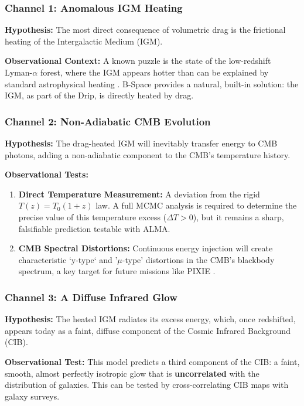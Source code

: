 \documentclass{BSpacePaper} %
\begin{document}
\begin{appendices}
\subsubsection{Channel 1: Anomalous IGM Heating}
\textbf{Hypothesis:} The most direct consequence of volumetric drag is the frictional heating of the Intergalactic Medium (IGM).

\textbf{Observational Context:} A known puzzle is the state of the low-redshift Lyman-$\alpha$ forest, where the IGM appears hotter than can be explained by standard astrophysical heating \citep{McQuinn2016}. B-Space provides a natural, built-in solution: the IGM, as part of the Drip, is directly heated by drag.

\subsubsection{Channel 2: Non-Adiabatic CMB Evolution}
\textbf{Hypothesis:} The drag-heated IGM will inevitably transfer energy to CMB photons, adding a non-adiabatic component to the CMB's temperature history.

\textbf{Observational Tests:}
\begin{enumerate}
    \item \textbf{Direct Temperature Measurement:} A deviation from the rigid $T(z) = T_0(1+z)$ law. A full MCMC analysis is required to determine the precise value of this temperature excess ($\Delta T > 0$), but it remains a sharp, falsifiable prediction testable with ALMA.
    \item \textbf{CMB Spectral Distortions:} Continuous energy injection will create characteristic `y-type` and '\(\mu\)-type' distortions in the CMB's blackbody spectrum, a key target for future missions like PIXIE \citep{Chluba2012}.
\end{enumerate}

\subsubsection{Channel 3: A Diffuse Infrared Glow}
\textbf{Hypothesis:} The heated IGM radiates its excess energy, which, once redshifted, appears today as a faint, diffuse component of the Cosmic Infrared Background (CIB).

\textbf{Observational Test:} This model predicts a third component of the CIB: a faint, smooth, almost perfectly isotropic glow that is \textbf{uncorrelated} with the distribution of galaxies. This can be tested by cross-correlating CIB maps with galaxy surveys.


\end{appendices}
\end{document}
